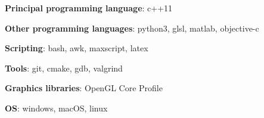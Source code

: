
\begin{cventries}
  \cventry
    {\vspace{-20pt}}
    {} 
    {}
    {}
    {
      \begin{cvitems} %
        \item{\textbf{Principal programming language}: c++11}
		\item{\textbf{Other programming languages}: python3, glsl, matlab, objective-c}
		\item{\textbf{Scripting}: bash, awk, maxscript, latex}
		\item{\textbf{Tools}: git, cmake, gdb, valgrind}
		\item{\textbf{Graphics libraries}: OpenGL Core Profile}
		\item{\textbf{OS}: windows, macOS, linux}
      \end{cvitems}
    }

\end{cventries}
